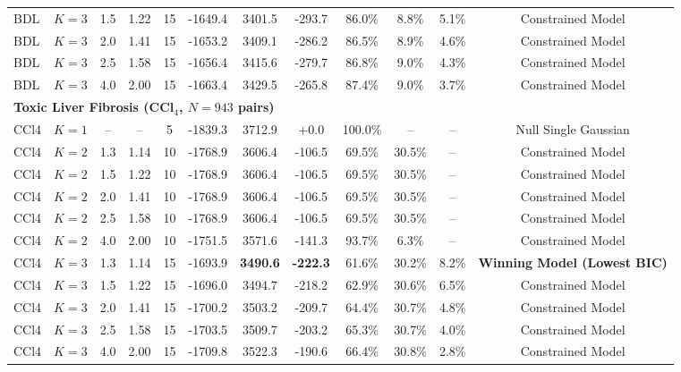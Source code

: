 \documentclass[10pt,a4paper,landscape]{article}
\begin{document}
\begin{table}[H]
\begin{tabular*}{\textwidth}{@{\extracolsep{\fill}} llcccccccccc}
BDL & $K=3$ & 1.5 & 1.22 & 15 & -1649.4 & 3401.5 & -293.7 & 86.0\% & 8.8\% & 5.1\% & Constrained Model \\
BDL & $K=3$ & 2.0 & 1.41 & 15 & -1653.2 & 3409.1 & -286.2 & 86.5\% & 8.9\% & 4.6\% & Constrained Model \\
BDL & $K=3$ & 2.5 & 1.58 & 15 & -1656.4 & 3415.6 & -279.7 & 86.8\% & 9.0\% & 4.3\% & Constrained Model \\
BDL & $K=3$ & 4.0 & 2.00 & 15 & -1663.4 & 3429.5 & -265.8 & 87.4\% & 9.0\% & 3.7\% & Constrained Model \\
\midrule
\multicolumn{12}{l}{\textbf{Toxic Liver Fibrosis (CCl$_4$, $N = 943$ pairs)}} \\
CCl4 & $K=1$ & -- & -- & 5 & -1839.3 & 3712.9 & +0.0 & 100.0\% & -- & -- & Null Single Gaussian \\
CCl4 & $K=2$ & 1.3 & 1.14 & 10 & -1768.9 & 3606.4 & -106.5 & 69.5\% & 30.5\% & -- & Constrained Model \\
CCl4 & $K=2$ & 1.5 & 1.22 & 10 & -1768.9 & 3606.4 & -106.5 & 69.5\% & 30.5\% & -- & Constrained Model \\
CCl4 & $K=2$ & 2.0 & 1.41 & 10 & -1768.9 & 3606.4 & -106.5 & 69.5\% & 30.5\% & -- & Constrained Model \\
CCl4 & $K=2$ & 2.5 & 1.58 & 10 & -1768.9 & 3606.4 & -106.5 & 69.5\% & 30.5\% & -- & Constrained Model \\
CCl4 & $K=2$ & 4.0 & 2.00 & 10 & -1751.5 & 3571.6 & -141.3 & 93.7\% & 6.3\% & -- & Constrained Model \\
\rowcolor{wincolor} CCl4 & $K=3$ & 1.3 & 1.14 & 15 & -1693.9 & \textbf{3490.6} & \textbf{-222.3} & 61.6\% & 30.2\% & 8.2\% & \textbf{Winning Model (Lowest BIC)} \\
CCl4 & $K=3$ & 1.5 & 1.22 & 15 & -1696.0 & 3494.7 & -218.2 & 62.9\% & 30.6\% & 6.5\% & Constrained Model \\
CCl4 & $K=3$ & 2.0 & 1.41 & 15 & -1700.2 & 3503.2 & -209.7 & 64.4\% & 30.7\% & 4.8\% & Constrained Model \\
CCl4 & $K=3$ & 2.5 & 1.58 & 15 & -1703.5 & 3509.7 & -203.2 & 65.3\% & 30.7\% & 4.0\% & Constrained Model \\
CCl4 & $K=3$ & 4.0 & 2.00 & 15 & -1709.8 & 3522.3 & -190.6 & 66.4\% & 30.8\% & 2.8\% & Constrained Model \\
\bottomrule
\end{tabular*}
\end{table}
\end{document}
